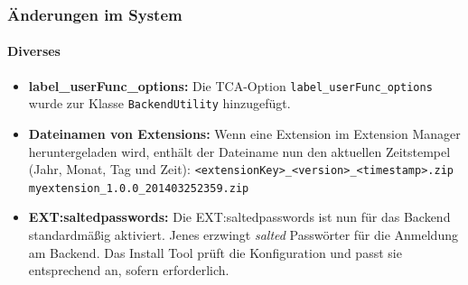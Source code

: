 \begin{frame}[fragile]
	\frametitle{Änderungen im System}
	\framesubtitle{Diverses}

	\begin{itemize}

		\item \textbf{label\_userFunc\_options:}\newline
			\small
				Die TCA-Option \texttt{label\_userFunc\_options} wurde zur Klasse \texttt{BackendUtility} hinzugefügt.
			\normalsize

		\item \textbf{Dateinamen von Extensions:}\newline
			\small
				Wenn eine Extension im Extension Manager heruntergeladen wird, enthält der Dateiname nun den aktuellen Zeitstempel (Jahr, Monat, Tag und Zeit):\newline
				\texttt{<extensionKey>\_<version>\_<timestamp>.zip}\newline
				\texttt{myextension\_1.0.0\_201403252359.zip}
			\normalsize

		\item \textbf{EXT:saltedpasswords:}\newline
			\small
				Die EXT:saltedpasswords ist nun für das Backend standardmäßig aktiviert. Jenes erzwingt \textit{salted} Passwörter für die Anmeldung am Backend. Das Install Tool prüft die Konfiguration und passt sie entsprechend an, sofern erforderlich.
			\normalsize

	\end{itemize}
	
\end{frame}


